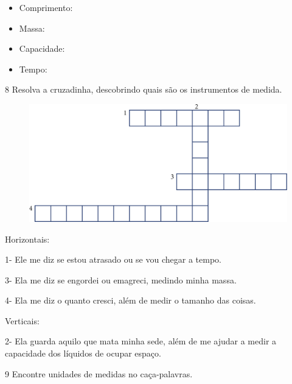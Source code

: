 \begin{itemize}
\item Comprimento:

\item Massa:

\item Capacidade:

\item Tempo:
\end{itemize}

\num{8} Resolva a cruzadinha, descobrindo quais são os instrumentos de medida.

\begin{figure}[htpb!]
\includegraphics[width=\textwidth]{./media/image38.png}
\end{figure}

Horizontais:

1- Ele me diz se estou atrasado ou se vou chegar a tempo.

3- Ela me diz se engordei ou emagreci, medindo minha massa.

4- Ela me diz o quanto cresci, além de medir o tamanho das coisas.

Verticais:

2- Ela guarda aquilo que mata minha sede, além de me ajudar a medir a
capacidade dos líquidos de ocupar espaço.

\num{9} Encontre unidades de medidas no caça-palavras.


